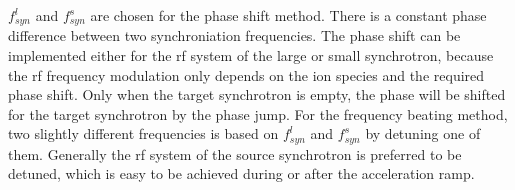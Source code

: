 %
$f_{\mathit{syn}}^{l}$ and $f_{\mathit{syn}}^{s}$ are chosen for the phase shift method. There is a constant phase difference between two synchroniation frequencies. The phase shift can be implemented either for the rf system of the large or small synchrotron, because the rf frequency modulation only depends on the ion species and the required phase shift. Only when the target synchrotron is empty, the phase will be shifted for the target synchrotron by the phase jump. For the frequency beating method, two slightly different frequencies is based on $f_{\mathit{syn}}^{l}$ and $f_{\mathit{syn}}^{s}$ by detuning one of them. Generally the rf system of the source synchrotron is preferred to be detuned, which is easy to be achieved during or after the acceleration ramp. 


